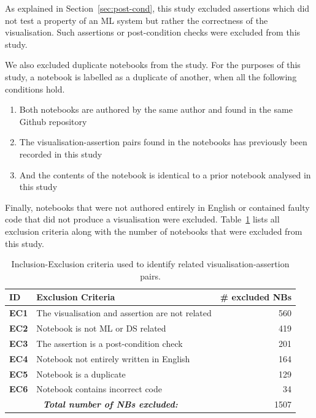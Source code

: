 \documentclass[conference]{IEEEtran}
\begin{document}
As explained in Section~\ref{sec:post-cond}, this study excluded assertions which did not test a property of an ML system but rather the correctness of the visualisation. Such assertions or post-condition checks were excluded from this study.

We also excluded duplicate notebooks from the study. For the purposes of this study, a notebook is labelled as a duplicate of another, when all the following conditions hold.

\begin{enumerate}
  \item Both notebooks are authored by the same author and found in the same Github repository
  \item The visualisation-assertion pairs found in the notebooks has previously been recorded in this study
  \item And the contents of the notebook is identical to a prior notebook analysed in this study
\end{enumerate}

Finally, notebooks that were not authored entirely in English or contained faulty code that did not produce a visualisation were excluded. Table~\ref{tab:exclusion-criteria} lists all exclusion criteria along with the number of notebooks that were excluded from this study.

\begin{table}
  \centering
  \caption{Inclusion-Exclusion criteria used to identify related visualisation-assertion pairs.}\label{tab:exclusion-criteria}
  \begin{tabularx}{0.47\textwidth}{@{}l X r@{}}
    \toprule
    \textbf{ID} &
    \textbf{Exclusion Criteria} &
    \textbf{\# excluded NBs}\\
    \midrule
    \textbf{EC1} &
    The visualisation and assertion are not related &
    560\\
    \textbf{EC2} &
    Notebook is not ML or DS related &
    419\\
    \textbf{EC3} &
    The assertion is a post-condition check &
    201\\
    \textbf{EC4} &
    Notebook not entirely written in English &
    164\\
    \textbf{EC5} &
    Notebook is a duplicate &
    129\\
    \textbf{EC6} &
    Notebook contains incorrect code &
    34\\
    \midrule
    \multicolumn{2}{c}{\emph{\textbf{Total number of NBs excluded:}}} &
    1507\\
    \bottomrule
  \end{tabularx}
\end{table}
\end{document}
